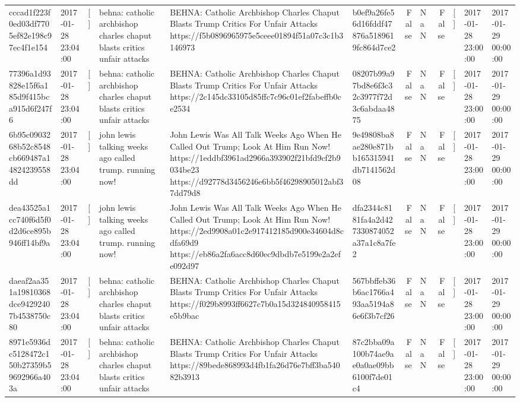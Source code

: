 \begin{tabular}{llllllrlrlll}
cccad1f223f0ed03df7705ef82e198c97ec4f1e154 & 2017-01-28 23:04:00 & [] & behna: catholic archbishop charles chaput blasts critics unfair attacks & BEHNA: Catholic Archbishop Charles Chaput Blasts Trump Critics For Unfair Attacks https://f5b0896965975e5ceee01894f51a07c3c1b3146973 & b0ef9a26fe56d16fddf47876a5189619fc864d7ce2 & False & NaN & False & [] & 2017-01-28 23:00:00 & 2017-01-29 00:00:00 \\
77396a1d93828e15f6a185d9f415bca915d6f247f6 & 2017-01-28 23:04:00 & [] & behna: catholic archbishop charles chaput blasts critics unfair attacks & BEHNA: Catholic Archbishop Charles Chaput Blasts Trump Critics For Unfair Attacks https://2c145dc33105d85ffc7c96c01ef2fabeffb0ce2534 & 08207b99a97bd8e6f3c32c3977f72d3c6abdaa4875 & False & NaN & False & [] & 2017-01-28 23:00:00 & 2017-01-29 00:00:00 \\
6b95c0903268b52c8548cb669487a14824239558dd & 2017-01-28 23:04:00 & [] & john lewis talking weeks ago called trump. running now! & John Lewis Was All Talk Weeks Ago When He Called Out Trump; Look At Him Run Now! https://1eddbf3961ad2966a393902f21bfd9cf2b9034be23 https://d92778d3456246e6bb5f46298905012abf37dd79d8 & 9e49808ba8ae280e871bb165315941db7141562d08 & False & NaN & False & [] & 2017-01-28 23:00:00 & 2017-01-29 00:00:00 \\
dea43525a1cc740f6d5f0d2d6ce895b946ff14bf9a & 2017-01-28 23:04:00 & [] & john lewis talking weeks ago called trump. running now! & John Lewis Was All Talk Weeks Ago When He Called Out Trump; Look At Him Run Now! https://2ed9908a01c2e917412185d900e34604d8cdfa69d9 https://eb86a2fa6acc8d60ec9dbdb7e5199e2a2efe092d97 & dfa2344c8181fa4a2d427330874052a37a1c8a7fe2 & False & NaN & False & [] & 2017-01-28 23:00:00 & 2017-01-29 00:00:00 \\
daeaf2aa351a19810368dce94292407b4538750c80 & 2017-01-28 23:04:00 & [] & behna: catholic archbishop charles chaput blasts critics unfair attacks & BEHNA: Catholic Archbishop Charles Chaput Blasts Trump Critics For Unfair Attacks https://f029b8993ff6627c7b0a15d324840958415e5b9bac & 567bbffeb36b6ac1766a493aa5194a86e6f3b7cf26 & False & NaN & False & [] & 2017-01-28 23:00:00 & 2017-01-29 00:00:00 \\
8971e5936dc5128472c150b27359b59692966a403a & 2017-01-28 23:04:00 & [] & behna: catholic archbishop charles chaput blasts critics unfair attacks & BEHNA: Catholic Archbishop Charles Chaput Blasts Trump Critics For Unfair Attacks https://89bede868993d4fb1fa26d76e7bff3ba54082b3913 & 87c2bba09a100b74ae9ae0a0ae09bb6100f7de01c4 & False & NaN & False & [] & 2017-01-28 23:00:00 & 2017-01-29 00:00:00 \\

\end{tabular}
